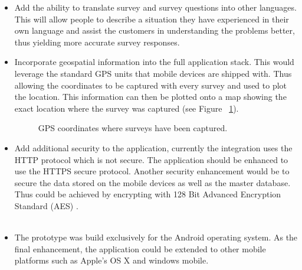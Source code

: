 \documentclass[12pt]{witseiepaper}
\begin{document}
\begin{itemize}
\item Add the ability to translate survey and survey questions into other languages. This will allow people to describe a situation they have experienced in their own language and assist the customers in understanding the problems better, thus yielding more accurate survey responses.
\\
\item Incorporate geospatial information into the full application stack. This would leverage the standard GPS units that mobile devices are shipped with. Thus allowing the coordinates to be captured with every survey and used to plot the location. This information can then be plotted onto a map showing the exact location where the survey was captured (see Figure ~\ref{fig:gps}). 

\begin{figure}[H]
	\caption{GPS coordinates where surveys have been captured.} 
	\label{fig:gps}
\end{figure}

\item Add additional security to the application, currently the integration uses the HTTP protocol which is not secure. The application should be enhanced to use the HTTPS secure protocol. Another security enhancement would be to secure the data stored on the mobile devices as well as the master database. Thus could be achieved by encrypting with 128 Bit Advanced Encryption Standard (AES) \cite{AES}. \\ \\

\item The prototype was build exclusively for the Android operating system. As the final enhancement, the application could be extended to other mobile platforms such as Apple's OS X and windows mobile.
\end{itemize}
\end{document}
